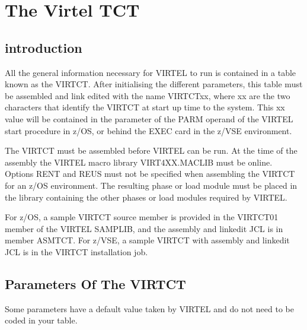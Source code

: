 \documentclass[letterpaper,10pt,english]{sphinxmanual}
\begin{document}
\label{\detokenize{Installation_Guide:vvrrig-virtct}}
\ignorespaces 

\chapter{The Virtel TCT}
\label{\detokenize{Installation_Guide:the-virtel-tct}}\label{\detokenize{Installation_Guide:index-29}}

\section{introduction}
\label{\detokenize{Installation_Guide:id5}}
\sphinxAtStartPar
All the general information necessary for VIRTEL to run is contained in a table known as the VIRTCT. After initialising the different  parameters, this table must be assembled and link edited with the name VIRTCTxx, where xx are the two characters that identify the VIRTCT at start up time to the system. This xx value will be contained in the parameter of the PARM operand of the VIRTEL start procedure in z/OS, or behind the EXEC card in the z/VSE environment.

\sphinxAtStartPar
The VIRTCT must be assembled before VIRTEL can be run. At the time of the assembly the VIRTEL macro library VIRT4XX.MACLIB must be on\sphinxhyphen{}line. Options RENT and REUS must not be specified when assembling the VIRTCT for an z/OS environment. The resulting phase or load module must be placed in the library containing the other phases or load modules required by VIRTEL.

\sphinxAtStartPar
For z/OS, a sample VIRTCT source member is provided in the VIRTCT01 member of the VIRTEL SAMPLIB, and the assembly and link\sphinxhyphen{}edit JCL is in member ASMTCT. For z/VSE, a sample VIRTCT with assembly and link\sphinxhyphen{}edit JCL is in the VIRTCT installation job.


\section{Parameters Of The VIRTCT}
\label{\detokenize{Installation_Guide:parameters-of-the-virtct}}
\sphinxAtStartPar
Some parameters have a default value taken by VIRTEL and do not need to be coded in your table.

\ignorespaces 
\end{document}
